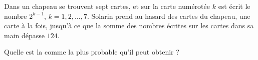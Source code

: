 \documentclass[varwidth]{standalone}
\begin{document}
    Dans un chapeau se trouvent sept cartes, et sur la carte num\'erot\'ee $k$ est \'ecrit le nombre $2^{k - 1}$, $k = 1, 2, \dots, 7$. Solarin prend au hasard des cartes du chapeau, une carte \`a la fois, jusqu'\`a ce que la somme des nombres \'ecrites sur les cartes dans sa main d\'epasse $124$.

    Quelle est la comme la plus probable qu'il peut obtenir ?
\end{document}
